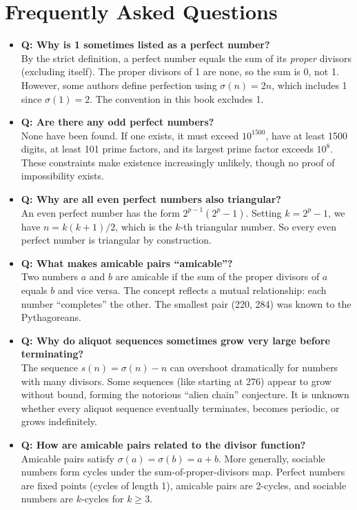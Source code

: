 \section{Frequently Asked Questions}

\begin{itemize}
\item \textbf{Q: Why is 1 sometimes listed as a perfect number?} \\
By the strict definition, a perfect number equals the sum of its \emph{proper} divisors (excluding itself). The proper divisors of 1 are none, so the sum is 0, not 1. However, some authors define perfection using $\sigma(n) = 2n$, which includes 1 since $\sigma(1) = 2$. The convention in this book excludes 1.

\item \textbf{Q: Are there any odd perfect numbers?} \\
None have been found. If one exists, it must exceed $10^{1500}$, have at least 1500 digits, at least 101 prime factors, and its largest prime factor exceeds $10^8$. These constraints make existence increasingly unlikely, though no proof of impossibility exists.

\item \textbf{Q: Why are all even perfect numbers also triangular?} \\
An even perfect number has the form $2^{p-1}(2^p - 1)$. Setting $k = 2^p - 1$, we have $n = k(k+1)/2$, which is the $k$-th triangular number. So every even perfect number is triangular by construction.

\item \textbf{Q: What makes amicable pairs ``amicable''?} \\
Two numbers $a$ and $b$ are amicable if the sum of the proper divisors of $a$ equals $b$ and vice versa. The concept reflects a mutual relationship: each number ``completes'' the other. The smallest pair (220, 284) was known to the Pythagoreans.

\item \textbf{Q: Why do aliquot sequences sometimes grow very large before terminating?} \\
The sequence $s(n) = \sigma(n) - n$ can overshoot dramatically for numbers with many divisors. Some sequences (like starting at 276) appear to grow without bound, forming the notorious ``alien chain'' conjecture. It is unknown whether every aliquot sequence eventually terminates, becomes periodic, or grows indefinitely.

\item \textbf{Q: How are amicable pairs related to the divisor function?} \\
Amicable pairs satisfy $\sigma(a) = \sigma(b) = a + b$. More generally, sociable numbers form cycles under the sum-of-proper-divisors map. Perfect numbers are fixed points (cycles of length 1), amicable pairs are 2-cycles, and sociable numbers are $k$-cycles for $k \geq 3$.


\end{itemize}
